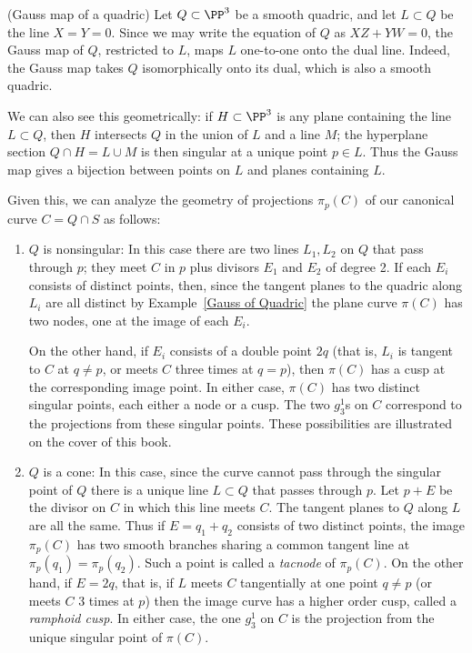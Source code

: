 \begin{example} (Gauss map of a quadric)\label{Gauss of Quadric}
 Let $Q\subset \PP^3$ be a smooth quadric, and let $L\subset Q$ be the line $X=Y =0$. Since we may write the equation of $Q$ as $XZ+YW = 0$, the Gauss map of $Q$, restricted to $L$, maps $L$ one-to-one onto the dual line. Indeed, the Gauss map takes $Q$ isomorphically onto its dual, which is also a smooth quadric.
 
 We can also see this geometrically: if $H \subset \PP^3$ is any plane containing the line $L \subset Q$, then $H$ intersects $Q$ in the union of $L$ and a line $M$; the hyperplane section $Q \cap H = L \cup M$ is then singular at a unique point $p \in L$. Thus the Gauss map gives a bijection between points on $L$ and planes containing $L$. 
\end{example}

Given this, we can analyze the geometry of projections $\pi_p(C)$ of our canonical curve $C = Q \cap S$ as follows:

\begin{enumerate}
\item $Q$ is nonsingular:
In this case there are two lines $L_1, L_2$ on $Q$ that pass through $p$; they meet $C$ in $p$ plus divisors $E_1$ and $E_2$ of degree 2. If each $E_i$ consists of distinct points, then, since the tangent planes to the quadric along $L_i$ are all distinct by Example~\ref{Gauss of Quadric} the plane curve $\pi(C)$ has two nodes, one at the image of each $E_i$.

On the other hand, if $E_i$ consists of a double point $2q$ (that is, $L_i$ is tangent to $C$ at $q\neq p$, or meets $C$ three times at $q = p$), then $\pi(C)$ has a cusp at the corresponding image point. 
In either case, $\pi(C)$ has two distinct singular points, each either a node or a cusp. The two $g^1_3$s on $C$ correspond to the projections from these singular points. These possibilities are illustrated on the cover of this book.

\item $Q$ is a cone:
In this case, since the curve cannot pass through the singular point of $Q$ there is a unique line $L\subset Q$ that passes through $p$. Let $p+E$ be the divisor on $C$ in which this line meets $C$. The tangent planes to $Q$ along $L$ are all the same. Thus if $E = q_1+q_2$ consists of two distinct points, the image $\pi_p(C)$ has two smooth branches sharing a common tangent line at
$\pi_p(q_1) = \pi_p(q_2)$. Such a point is called a \emph{tacnode} of $\pi_p(C)$. On the other hand, if $E= 2q$, that is, if $L$ meets $C$ tangentially at one point $q\neq p$ (or meets $C$ 3 times at $p$) then the image curve has a higher order cusp, called a \emph{ramphoid cusp}. In either case, the one $g^1_3$ on $C$ is the projection from the unique singular point of $\pi(C)$.
\end{enumerate}

